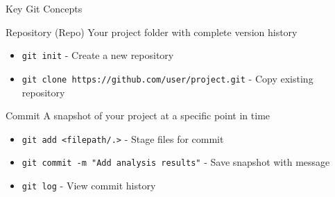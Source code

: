 \documentclass[aspectratio=1609]{beamer}
\begin{document}
\begin{frame}[fragile]{Key Git Concepts}
    \begin{tblock}{Repository (Repo)}
        Your project folder with complete version history
        \begin{itemize}
            \item \verb|git init| - Create a new repository
            \item \verb|git clone https://github.com/user/project.git| - Copy existing repository
        \end{itemize}
        \end{tblock}
        \begin{tblock}{Commit}
            A snapshot of your project at a specific point in time
            \begin{itemize}
                \item \verb|git add <filepath/.>| - Stage files for commit
                \item \verb|git commit -m "Add analysis results"| - Save snapshot with message
                \item \verb|git log| - View commit history
            \end{itemize}
        \end{tblock}
\end{frame}
\end{document}
